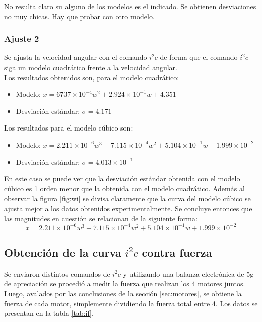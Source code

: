 \documentclass[spanish,12pt,a4paper,titlepage]{report}
\begin{document}
No resulta claro su alguno de los modelos es el indicado. Se obtienen desviaciones no muy chicas. Hay que probar con otro modelo.

\subsubsection*{Ajuste 2}
Se ajusta la velocidad angular con el comando $i^2c$ de forma que el comando $i^2c$ siga un modelo cuadrático frente a la velocidad angular.\\

Los resultados obtenidos son, para el modelo cuadrático:
\begin{itemize}
\item Modelo: $x=6737\times 10^{-4}w^2+2.924\times 10^{-1}w+4.351$
\item Desviación estándar: $\sigma = 4.171$
\end{itemize}
Los resultados para el modelo cúbico son:
\begin{itemize}
\item Modelo: $x=2.211\times 10^{-6}w^3-7.115\times 10^{-4}w^2+5.104\times 10^{-1}w+1.999\times 10^{-2}$
\item Desviación estándar: $\sigma = 4.013\times 10^{-1}$
\end{itemize}

En este caso se puede ver que la desviación estándar obtenida con el modelo cúbico es 1 orden menor que la obtenida con el modelo cuadrático. Además al observar la figura \ref{fig:wi} se divisa claramente que la curva del modelo cúbico se ajusta mejor a los datos obtenidos experimentalmente. Se concluye entonces que las magnitudes en cuestión se relacionan de la siguiente forma:
$$x=2.211\times 10^{-6}w^3-7.115\times 10^{-4}w^2+5.104\times 10^{-1}w+1.999\times 10^{-2}$$

\subsection{Obtención de la curva $i^2c$ contra fuerza}

Se enviaron distintos comandos de $i^2c$ y utilizando una balanza electrónica de 5g de apreciación se procedió a medir la fuerza que realizan los 4 motores juntos. Luego, avalados por las conclusiones de la sección \ref{sec:motores}, se obtiene la fuerza de cada motor, simplemente dividiendo la fuerza total entre 4. Los datos se presentan en la tabla \ref{tab:if}.
\end{document}
